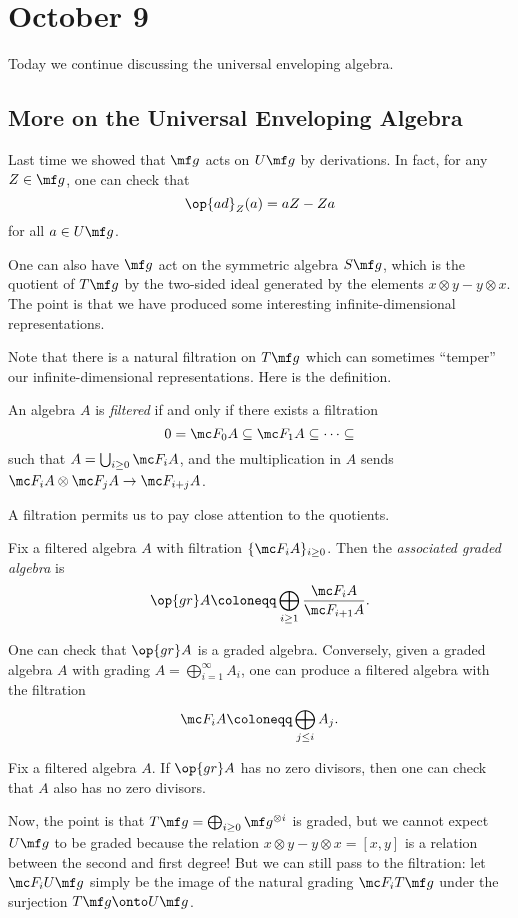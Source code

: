 \documentclass[../notes.tex]{subfiles}
\begin{document}
\section{October 9}
Today we continue discussing the universal enveloping algebra.

\subsection{More on the Universal Enveloping Algebra}
Last time we showed that $\mf g$ acts on $U\mf g$ by derivations. In fact, for any $Z\in\mf g$, one can check that
\[\op{ad}_Z(a)=aZ-Za\]
for all $a\in U\mf g$.
\begin{remark}
	One can also have $\mf g$ act on the symmetric algebra $S\mf g$, which is the quotient of $T\mf g$ by the two-sided ideal generated by the elements $x\otimes y-y\otimes x$. The point is that we have produced some interesting infinite-dimensional representations.
\end{remark}
Note that there is a natural filtration on $T\mf g$ which can sometimes ``temper'' our infinite-dimensional representations. Here is the definition.
\begin{definition}[filtered]
	An algebra $A$ is \textit{filtered} if and only if there exists a filtration
	\[0=\mc F_0A\subseteq\mc F_1A\subseteq\cdots\subseteq\]
	such that $A=\bigcup_{i\ge0}\mc F_iA$, and the multiplication in $A$ sends $\mc F_iA\otimes\mc F_jA\to\mc F_{i+j}A$.
\end{definition}
A filtration permits us to pay close attention to the quotients.
\begin{definition}
	Fix a filtered algebra $A$ with filtration $\{\mc F_iA\}_{i\ge0}$. Then the \textit{associated graded algebra} is
	\[\op{gr}A\coloneqq\bigoplus_{i\ge1}\frac{\mc F_iA}{\mc F_{i+1}A}.\]
\end{definition}
\begin{remark}
	One can check that $\op{gr}A$ is a graded algebra. Conversely, given a graded algebra $A$ with grading $A=\bigoplus_{i=1}^\infty A_i$, one can produce a filtered algebra with the filtration
	\[\mc F_iA\coloneqq\bigoplus_{j\le i}A_j.\]
\end{remark}
\begin{remark}
	Fix a filtered algebra $A$. If $\op{gr}A$ has no zero divisors, then one can check that $A$ also has no zero divisors.
\end{remark}
Now, the point is that $T\mf g=\bigoplus_{i\ge0}\mf g^{\otimes i}$ is graded, but we cannot expect $U\mf g$ to be graded because the relation $x\otimes y-y\otimes x=[x,y]$ is a relation between the second and first degree! But we can still pass to the filtration: let $\mc F_iU\mf g$ simply be the image of the natural grading $\mc F_iT\mf g$ under the surjection $T\mf g\onto U\mf g$.
\end{document}

